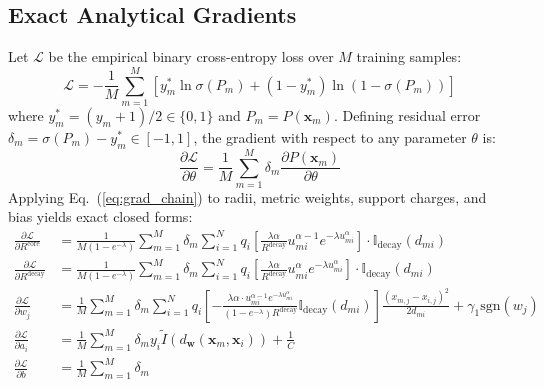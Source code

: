 \documentclass[times, review, 10pt]{elsarticle}
\begin{document}
\subsection{Exact Analytical Gradients}
Let $\mathcal{L}$ be the empirical binary cross-entropy loss over $M$ training samples:
\begin{equation}
\mathcal{L} = -\frac{1}{M}\sum_{m=1}^M \left[ y_m^* \ln \sigma(P_m) + (1 - y_m^*) \ln(1 - \sigma(P_m)) \right]
\label{eq:bce_loss}
\end{equation}
where $y_m^* = (y_m + 1)/2 \in \{0, 1\}$ and $P_m = P(\mathbf{x}_m)$. Defining residual error $\delta_m = \sigma(P_m) - y_m^* \in [-1, 1]$, the gradient with respect to any parameter $\theta$ is:
\begin{equation}
\frac{\partial \mathcal{L}}{\partial \theta} = \frac{1}{M}\sum_{m=1}^M \delta_m \frac{\partial P(\mathbf{x}_m)}{\partial \theta}
\label{eq:grad_chain}
\end{equation}
Applying Eq.~(\ref{eq:grad_chain}) to radii, metric weights, support charges, and bias yields exact closed forms:
\begin{align}
\frac{\partial \mathcal{L}}{\partial R^{\mathrm{core}}} &= \frac{1}{M (1 - e^{-\lambda})}\sum_{m=1}^{M} \delta_m \sum_{i=1}^{N} q_i \left[ \frac{\lambda \alpha}{R^{\mathrm{decay}}} u_{mi}^{\alpha-1} e^{-\lambda u_{mi}^\alpha} \right] \cdot \mathbb{I}_{\text{decay}}(d_{mi}) \label{eq:grad_rcore} \\
\frac{\partial \mathcal{L}}{\partial R^{\mathrm{decay}}} &= \frac{1}{M (1 - e^{-\lambda})}\sum_{m=1}^{M} \delta_m \sum_{i=1}^{N} q_i \left[ \frac{\lambda \alpha}{R^{\mathrm{decay}}} u_{mi}^{\alpha} e^{-\lambda u_{mi}^\alpha} \right] \cdot \mathbb{I}_{\text{decay}}(d_{mi}) \label{eq:grad_rdecay} \\
\frac{\partial \mathcal{L}}{\partial w_j} &= \frac{1}{M}\sum_{m=1}^{M} \delta_m \sum_{i=1}^{N} q_i \left[ -\frac{\lambda \alpha \cdot u_{mi}^{\alpha-1} e^{-\lambda u_{mi}^\alpha}}{(1 - e^{-\lambda}) R^{\mathrm{decay}}} \mathbb{I}_{\text{decay}}(d_{mi}) \right] \frac{(x_{m,j} - x_{i,j})^2}{2 d_{mi}} + \gamma_1 \mathrm{sgn}(w_j) \label{eq:grad_wj} \\
\frac{\partial \mathcal{L}}{\partial a_i} &= \frac{1}{M}\sum_{m=1}^M \delta_m y_i \tilde{I}(d_{\mathbf{w}}(\mathbf{x}_m, \mathbf{x}_i)) + \frac{1}{C} \label{eq:grad_ai} \\
\frac{\partial \mathcal{L}}{\partial b} &= \frac{1}{M}\sum_{m=1}^M \delta_m \label{eq:grad_b}
\end{align}
\end{document}
